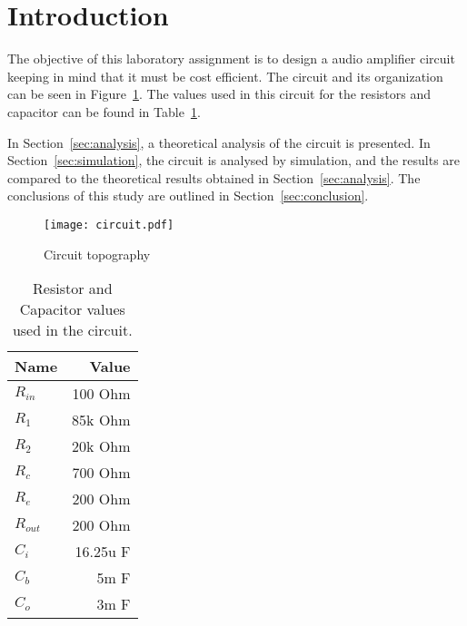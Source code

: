 \section{Introduction}
\label{sec:introduction}

\tab The objective of this laboratory assignment is to design a audio amplifier circuit keeping in mind that it must be cost efficient.
The circuit and its organization can be seen in Figure~\ref{fig:circuit}.
The values used in this circuit for the resistors and capacitor can be found in Table~\ref{tab:values}.

In Section~\ref{sec:analysis}, a theoretical analysis of the circuit is
presented. In Section~\ref{sec:simulation}, the circuit is analysed by
simulation, and the results are compared to the theoretical results obtained in
Section~\ref{sec:analysis}. The conclusions of this study are outlined in
Section~\ref{sec:conclusion}.
\\[1cm]
\begin{figure}[h] \centering
\texttt{[image: circuit.pdf]}
\caption{Circuit topography}
\label{fig:circuit}
\end{figure}

\begin{table}[H]
  \centering
  \begin{tabular}{|l|r|}
    \hline    
    {\bf Name} & {\bf Value} \\ \hline
    $R_{in}$ & 100 Ohm \\ \hline
    $R_1$ & 85k Ohm \\ \hline
    $R_2$ & 20k Ohm \\ \hline
    $R_c$ & 700 Ohm \\ \hline
    $R_e$ & 200 Ohm \\ \hline
    $R_{out}$ & 200 Ohm \\ \hline	
    $C_i$ & 16.25u F \\ \hline
    $C_b$ & 5m F \\ \hline
    $C_o$ & 3m F \\ \hline	
  \end{tabular}
  \caption{Resistor and Capacitor values used in the circuit.}
  \label{tab:values}
\end{table}
